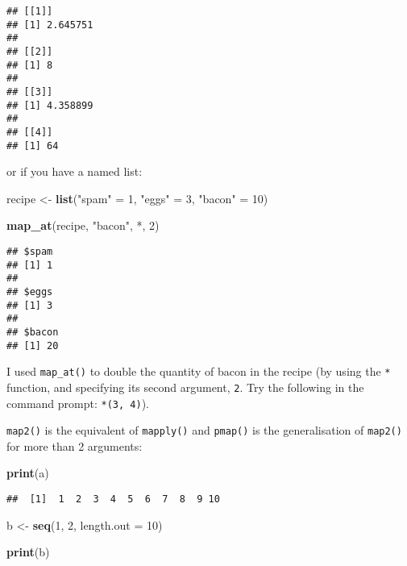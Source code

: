 \documentclass[
]{article}
\newenvironment{Shaded}{\begin{snugshade}}{\end{snugshade}}
\newcommand{\DataTypeTok}[1]{\textcolor[rgb]{0.13,0.29,0.53}{#1}}
\newcommand{\DecValTok}[1]{\textcolor[rgb]{0.00,0.00,0.81}{#1}}
\newcommand{\KeywordTok}[1]{\textcolor[rgb]{0.13,0.29,0.53}{\textbf{#1}}}
\newcommand{\NormalTok}[1]{#1}
\newcommand{\StringTok}[1]{\textcolor[rgb]{0.31,0.60,0.02}{#1}}
\begin{document}
\begin{verbatim}
## [[1]]
## [1] 2.645751
## 
## [[2]]
## [1] 8
## 
## [[3]]
## [1] 4.358899
## 
## [[4]]
## [1] 64
\end{verbatim}

or if you have a named list:

\begin{Shaded}
\begin{Highlighting}[]
\NormalTok{recipe \textless{}{-}}\StringTok{ }\KeywordTok{list}\NormalTok{(}\StringTok{"spam"}\NormalTok{ =}\StringTok{ }\DecValTok{1}\NormalTok{, }\StringTok{"eggs"}\NormalTok{ =}\StringTok{ }\DecValTok{3}\NormalTok{, }\StringTok{"bacon"}\NormalTok{ =}\StringTok{ }\DecValTok{10}\NormalTok{)}

\KeywordTok{map\_at}\NormalTok{(recipe, }\StringTok{"bacon"}\NormalTok{, }\StringTok{\textasciigrave{}}\DataTypeTok{*}\StringTok{\textasciigrave{}}\NormalTok{, }\DecValTok{2}\NormalTok{)}
\end{Highlighting}
\end{Shaded}

\begin{verbatim}
## $spam
## [1] 1
## 
## $eggs
## [1] 3
## 
## $bacon
## [1] 20
\end{verbatim}

I used \texttt{map\_at()} to double the quantity of bacon in the recipe (by using the \texttt{*} function, and specifying
its second argument, \texttt{2}. Try the following in the command prompt: \texttt{\textasciigrave{}*\textasciigrave{}(3,\ 4)}).

\texttt{map2()} is the equivalent of \texttt{mapply()} and \texttt{pmap()} is the generalisation of \texttt{map2()} for more
than 2 arguments:

\begin{Shaded}
\begin{Highlighting}[]
\KeywordTok{print}\NormalTok{(a)}
\end{Highlighting}
\end{Shaded}

\begin{verbatim}
##  [1]  1  2  3  4  5  6  7  8  9 10
\end{verbatim}

\begin{Shaded}
\begin{Highlighting}[]
\NormalTok{b \textless{}{-}}\StringTok{ }\KeywordTok{seq}\NormalTok{(}\DecValTok{1}\NormalTok{, }\DecValTok{2}\NormalTok{, }\DataTypeTok{length.out =} \DecValTok{10}\NormalTok{)}

\KeywordTok{print}\NormalTok{(b)}
\end{Highlighting}
\end{Shaded}
\end{document}
